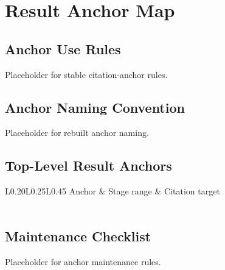 \chapter{Result Anchor Map}
\label{chap:result-anchor-map}


\section{Anchor Use Rules}
\label{sec:anchor-use-rules}

Placeholder for stable citation-anchor rules.

\section{Anchor Naming Convention}
\label{sec:anchor-naming-convention}

Placeholder for rebuilt anchor naming.

\section{Top-Level Result Anchors}
\label{sec:top-level-result-anchors}

\begin{longtable}{L{0.20\textwidth}L{0.25\textwidth}L{0.45\textwidth}}
\toprule
Anchor & Stage range & Citation target \\
\midrule
\endhead
{} \\
\bottomrule
\end{longtable}

\section{Maintenance Checklist}
\label{sec:anchor-maintenance-checklist}

Placeholder for anchor maintenance rules.
